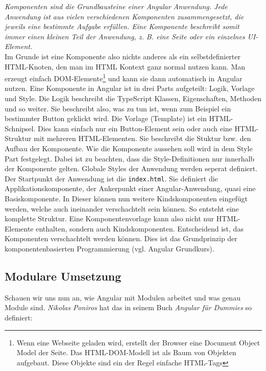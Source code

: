 \textit{\glqq Komponenten sind die Grundbausteine einer Angular Anwendung. Jede Anwendung ist aus vielen verschiedenen Komponenten zusammengesetzt, die jeweils eine bestimmte Aufgabe erfüllen. Eine Komponente beschreibt somit immer einen kleinen Teil der Anwendung, z. B. eine Seite oder ein einzelnes UI-Element.\grqq }\cite{woiwode_angular:_2017} \\

%
Im Grunde ist eine Komponente also nichts anderes als ein selbstdefinierter HTML-Knoten, den man im HTML Kontext ganz normal nutzen kann. Man erzeugt einfach DOM-Elemente\footnote{Wenn eine Webseite geladen wird, erstellt der Browser eine Document Object Model der Seite. Das HTML-DOM-Modell ist als Baum von Objekten aufgebaut. Diese Objekte sind ein der Regel einfache HTML-Tags} und kann sie dann automatisch in Angular nutzen.
Eine Komponente in Angular ist in drei Parts aufgeteilt: Logik, Vorlage und Style. Die Logik beschreibt die TypeScript Klassen, Eigenschaften, Methoden und so weiter. Sie beschreibt also, was zu tun ist, wenn zum Beispiel ein bestimmter Button geklickt wird. Die Vorlage (Template) ist ein HTML-Schnipsel. Dies kann einfach nur ein Button-Element sein oder auch eine HTML-Struktur mit mehreren HTML-Elementen. Sie beschreibt die Stuktur bzw. den Aufbau der Komponente. Wie die Komponente aussehen soll wird in dem Style Part festgelegt. Dabei ist zu beachten, dass die Style-Definitionen nur innerhalb der Komponente gelten. Globale Styles der Anwendung werden seperat definiert.\\
Der Startpunkt der Anwendung ist die \texttt{index.html}. Sie definiert die Applikationskomponente, der Ankerpunkt einer Angular-Anwendung, quasi eine Basiskomponente. In Dieser können nun weitere Kindskomponenten eingefügt werden, welche auch ineinander verschachtelt sein können. So entsteht eine komplette Struktur. Eine Komponentenvorlage kann also nicht nur HTML-Elemente enthalten, sondern auch Kindskomponenten. Entscheidend ist, das Komponenten verschachtelt werden können. Dies ist das Grundprinzip der komponentenbasierten Programmierung (vgl. Angular Grundkurs\cite{unlu_angular_2018}).

\subsection{Modulare Umsetzung}
Schauen wir uns nun an, wie Angular mit Modulen arbeitet und was genau Module sind. \textit{Nikolas Poniros} hat das in seinem Buch \textit{Angular für Dummies} so definiert:\\

